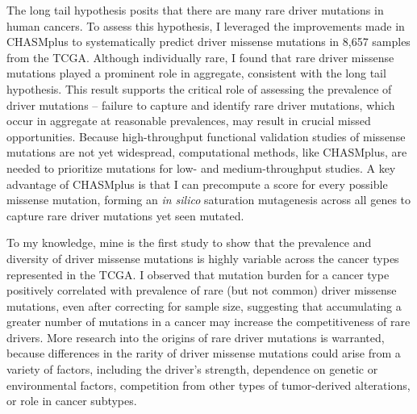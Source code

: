 The long tail hypothesis \cite{RN147, RN148} posits that there are many rare driver mutations in human cancers. To assess this hypothesis, I leveraged the improvements made in CHASMplus to systematically predict driver missense mutations in 8,657 samples from the TCGA. Although individually rare, I found that rare driver missense mutations played a prominent role in aggregate, consistent with the long tail hypothesis. This result supports the critical role of assessing the prevalence of driver mutations -- failure to capture and identify rare driver mutations, which occur in aggregate at reasonable prevalences, may result in crucial missed opportunities.   Because high-throughput functional validation studies of missense mutations are not yet widespread, computational methods, like CHASMplus, are needed to prioritize mutations for low- and medium-throughput studies. A key advantage of CHASMplus is that I can precompute a score for every possible missense mutation, forming an \textit{in silico} saturation mutagenesis across all genes to capture rare driver mutations yet seen mutated.

To my knowledge, mine is the first study to show that the prevalence and diversity of driver missense mutations is highly variable across the cancer types represented in the TCGA.  I observed that mutation burden for a cancer type positively correlated with prevalence of rare (but not common) driver missense mutations, even after correcting for sample size, suggesting that accumulating a greater number of mutations in a cancer may increase the competitiveness of rare drivers. More research into the origins of rare driver mutations is warranted, because differences in the rarity of driver missense mutations could arise from a variety of factors, including the driver's strength, dependence on genetic or environmental factors, competition from other types of tumor-derived alterations, or role in cancer subtypes.
